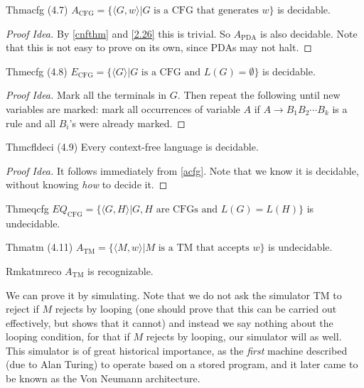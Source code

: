 \begin{reference}{Thm}{acfg}
  (4.7) $A_{\mathrm{CFG}}=\{\langle G, w\rangle|G\text{ is a CFG that generates }w\}$ is decidable.
\end{reference}

\begin{proof}[Proof Idea]
  By \ref{cnfthm} and \ref{2.26} this is trivial. So $A_{\mathrm{PDA}}$ is also decidable. Note that this is not easy to prove on its own, since PDAs may not halt.
\end{proof}

\begin{reference}{Thm}{ecfg}
  (4.8) $E_{\mathrm{CFG}}=\{\langle G\rangle|G\text{ is a CFG and }L(G)=\emptyset\}$ is decidable.
\end{reference}

\begin{proof}[Proof Idea]
  Mark all the terminals in $G$. Then repeat the following until new variables are marked: mark all occurrences of variable $A$ if $A\to B_1B_2\cdots B_k$ is a rule and all $B_i$'s were already marked.
\end{proof}

\begin{reference}{Thm}{cfldeci}
  (4.9) Every context-free language is decidable.
\end{reference}

\begin{proof}[Proof Idea]
  It follows immediately from \ref{acfg}. Note that we know it is decidable, without knowing \textit{how} to decide it.
\end{proof}

\begin{reference}{Thm}{eqcfg}
  $EQ_{\mathrm{CFG}}=\{\langle G,H\rangle|G,H\text{ are CFGs and }L(G)=L(H)\}$ is undecidable.
\end{reference}

\begin{reference}{Thm}{atm}
  (4.11) $A_{\mathrm{TM}}=\{\langle M,w\rangle|M\text{ is a TM that accepts }w\}$ is undecidable.
\end{reference}

\begin{reference}{Rmk}{atmreco}
  $A_{\mathrm{TM}}$ is recognizable.
\end{reference}

We can prove it by simulating. Note that we do not ask the simulator TM to reject if $M$ rejects by looping (one should prove that this can be carried out effectively, but shows that it cannot) and instead we say nothing about the looping condition, for that if $M$ rejects by looping, our simulator will as well. This simulator is of great historical importance, as the \textit{first} machine described (due to Alan Turing) to operate based on a stored program, and it later came to be known as the Von Neumann architecture.

